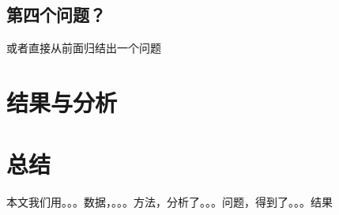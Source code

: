 \documentclass{acm_proc_article-sp}
\newcommand\TODO[1]{{\color{red}{Todo: #1}}}
\begin{document}
\begin{spacing}{1.2}
\subsection{第四个问题？}
\TODO{思考第四个问题} 或者直接从前面归结出一个问题

\section{结果与分析}

\section{总结}
本文我们用。。。数据，。。。方法，分析了。。。问题，得到了。。。结果

%
\begin{spacing}{1}

\end{spacing}
%
%
\end{spacing}
\end{document}
